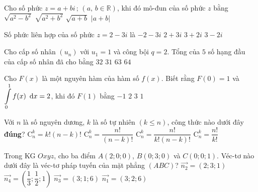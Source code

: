 \begin{ex}%
	Cho số phức $z=a+bi\,;\,( a,\,b\in \mathbb{R} )$, khi đó mô-đun của số phức $z$ bằng
	\choice
	{$\sqrt{a^2-b^2}$ }
	{\True $\sqrt{a^2+b^2}$}
	{$\sqrt{a+b}$}
	{$\left| a+b \right|$}
\end{ex}
\begin{ex}%
	Số phức liên hợp của số phức $z=2-3i$ là
	\choice
	{$-2-3i$}
	{\True $2+3i$}
	{$3+2i$}
	{$3-2i$}
\end{ex}
\begin{ex}%
	Cho cấp số nhân $( u_n )$ với $u_1=1$ và công bội $q=2$. Tổng của $5$ số hạng đầu của cấp số nhân đã cho bằng 
	\choice
	{$32$ }
	{\True $31$}
	{$63$}
	{$64$}
\end{ex}
\begin{ex}%
	Cho $F( x )$ là một nguyên hàm của hàm số $f( x )$. Biết rằng $F( 0 )=1$ và $\displaystyle\int\limits_0^1{f( x )} \text{\, d}x=2$, khi đó $F( 1 )$ bằng 
	\choice
	{$-1$}
	{$2$}
	{\True $3$}
	{$1$}
\end{ex}
\begin{ex}%
	Với $n$ là số nguyên dương, $k$ là số tự nhiên $( k\le n )$, công thức nào dưới đây \textbf{đúng}?
	\choice
	{$\mathrm{C}_n^k=k!( n-k )!$ }
	{$\mathrm{C}_n^k=\dfrac{n!}{( n-k )!}$}
	{\True $\mathrm{C}_n^k=\dfrac{n!}{k!( n-k )!}$ }
	{$\mathrm{C}_n^k=\dfrac{n!}{k!}$}
\end{ex}
\begin{ex}%
	Trong KG $Oxyz$, cho ba điểm $A( 2;0;0 )$, $B( 0;3;0 )$ và $C( 0;0;1 )$. Véc-tơ nào dưới đây là véc-tơ pháp tuyến của mặt phẳng $( ABC )$?
	\choice
	{$\overrightarrow{n_2}=( 2;3;1 )$}
	{$\overrightarrow{n_4}=( \dfrac{1}{3};\dfrac{1}{2};1 )$}
	{$\overrightarrow{n_3}=( 3;1;6 )$}
	{\True $\overrightarrow{n_1}=( 3;2;6 )$}
\end{ex}
